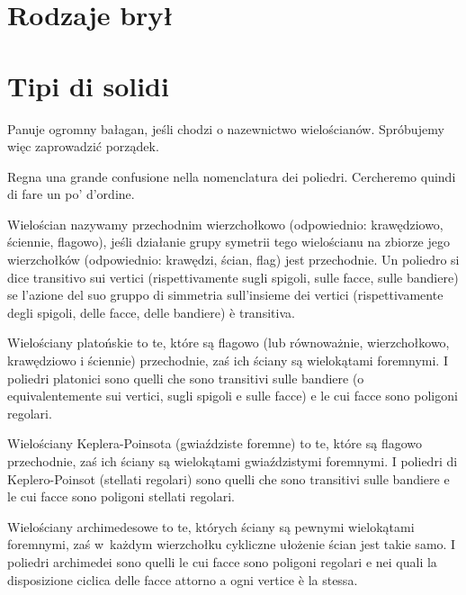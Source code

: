 %

\section{Rodzaje brył} %
\section{Tipi di solidi} %

Panuje ogromny bałagan, jeśli chodzi o nazewnictwo wielościanów. %
Spróbujemy więc zaprowadzić porządek. %

Regna una grande confusione nella nomenclatura dei poliedri. %
Cercheremo quindi di fare un po' d'ordine. %

\begin{definition}
    Wielościan nazywamy przechodnim wierzchołkowo (odpowiednio: krawędziowo, ściennie, flagowo), jeśli działanie grupy symetrii tego wielościanu na zbiorze jego wierzchołków (odpowiednio: krawędzi, ścian, flag) jest przechodnie. %
    Un poliedro si dice transitivo sui vertici (rispettivamente sugli spigoli, sulle facce, sulle bandiere) se l'azione del suo gruppo di simmetria sull'insieme dei vertici (rispettivamente degli spigoli, delle facce, delle bandiere) è transitiva. %
\end{definition}

\begin{definition}
    Wielościany platońskie to te, które są flagowo (lub równoważnie, wierzchołkowo, krawędziowo i ściennie) przechodnie, zaś ich ściany są wielokątami foremnymi. %
    I poliedri platonici sono quelli che sono transitivi sulle bandiere (o equivalentemente sui vertici, sugli spigoli e sulle facce) e le cui facce sono poligoni regolari. %
\end{definition}

\begin{definition}
    Wielościany Keplera-Poinsota (gwiaździste foremne) to te, które są flagowo przechodnie, zaś ich ściany są wielokątami gwiaździstymi foremnymi. %
    I poliedri di Keplero-Poinsot (stellati regolari) sono quelli che sono transitivi sulle bandiere e le cui facce sono poligoni stellati regolari. %
\end{definition}

\begin{definition}
\label{wieloscian_archimedesowy}%
    Wielościany archimedesowe to te, których ściany są pewnymi wielokątami foremnymi, zaś w~każdym wierzchołku cykliczne ułożenie ścian jest takie samo. %
    I poliedri archimedei sono quelli le cui facce sono poligoni regolari e nei quali la disposizione ciclica delle facce attorno a ogni vertice è la stessa. %
\end{definition}

